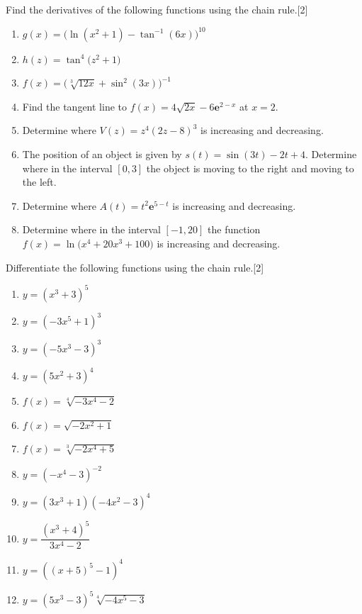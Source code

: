 \begin{multicolblock}{Find the derivatives of the following functions using the chain rule.}[2]
\begin{enumerate}
  \item $g(x)=\bigl(\ln(x^2+1)-\tan^{-1}(6x)\bigr)^{10}$
  \item $h(z)=\tan^4\bigl(z^2+1\bigr)$
  \item $f(x)=\bigl(\sqrt[3]{12x}+\sin^2(3x)\bigr)^{-1}$
  \item Find the tangent line to $f(x)=4\sqrt{2x}-6\mathbf{e}^{2-x}$ at $x=2$.
  \item Determine where $V(z)=z^4(2z-8)^3$ is increasing and decreasing.
  \item The position of an object is given by $s(t)=\sin(3t)-2t+4$. Determine where in the interval $[0,3]$ the object is moving to the right and moving to the left.
  \item Determine where $A(t)=t^2\mathbf{e}^{5-t}$ is increasing and decreasing.
  \item Determine where in the interval $[-1,20]$ the function $f(x)=\ln\bigl(x^4+20x^3+100\bigr)$ is increasing and decreasing.
\end{enumerate}
\end{multicolblock}

\begin{multicolblock}{Differentiate the following functions using the chain rule.}[2]
\begin{enumerate}
  \item $y=\left(x^{3}+3\right)^{5}$
  \item $y=\left(-3x^{5}+1\right)^{3}$
  \item $y=\left(-5x^{3}-3\right)^{3}$
  \item $y=\left(5x^{2}+3\right)^{4}$
  \item $f(x)=\sqrt[4]{-3x^{4}-2}$
  \item $f(x)=\sqrt{-2x^{2}+1}$
  \item $f(x)=\sqrt[3]{-2x^{4}+5}$
  \item $y=\left(-x^{4}-3\right)^{-2}$
  \item $y=\left(3x^{3}+1\right)\left(-4x^{2}-3\right)^{4}$
  \item $y=\dfrac{\left(x^{3}+4\right)^{5}}{3x^{4}-2}$
  \item $y=\left((x+5)^{5}-1\right)^{4}$
  \item $y=\left(5x^{3}-3\right)^{5}\sqrt[4]{-4x^{5}-3}$
\end{enumerate}
\end{multicolblock}










